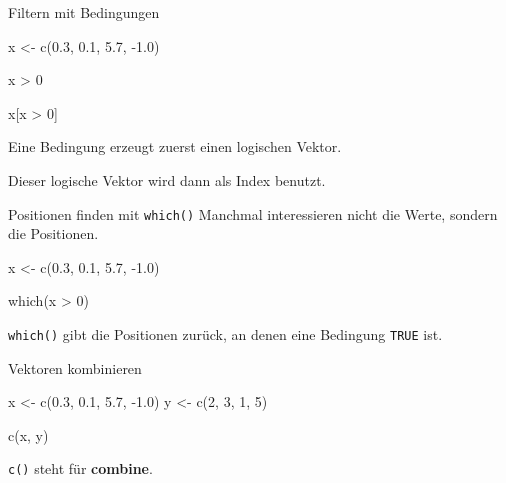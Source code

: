 \documentclass[
  10pt,
  ignorenonframetext,
  aspectratio=169,
]{beamer}
\newenvironment{Shaded}{}{}
\newcommand{\DecValTok}[1]{\textcolor[rgb]{0.25,0.63,0.44}{#1}}
\newcommand{\FloatTok}[1]{\textcolor[rgb]{0.25,0.63,0.44}{#1}}
\newcommand{\FunctionTok}[1]{\textcolor[rgb]{0.02,0.16,0.49}{#1}}
\newcommand{\NormalTok}[1]{#1}
\newcommand{\OtherTok}[1]{\textcolor[rgb]{0.00,0.44,0.13}{#1}}
\newcommand{\SpecialCharTok}[1]{\textcolor[rgb]{0.25,0.44,0.63}{#1}}
\begin{document}
\begin{frame}[fragile]{Filtern mit Bedingungen}
\label{filtern-mit-bedingungen}
\begin{Shaded}
\begin{Highlighting}[]
\NormalTok{x }\OtherTok{\textless{}{-}} \FunctionTok{c}\NormalTok{(}\FloatTok{0.3}\NormalTok{, }\FloatTok{0.1}\NormalTok{, }\FloatTok{5.7}\NormalTok{, }\SpecialCharTok{{-}}\FloatTok{1.0}\NormalTok{)}

\NormalTok{x }\SpecialCharTok{\textgreater{}} \DecValTok{0}

\NormalTok{x[x }\SpecialCharTok{\textgreater{}} \DecValTok{0}\NormalTok{]}
\end{Highlighting}
\end{Shaded}

Eine Bedingung erzeugt zuerst einen logischen Vektor.

Dieser logische Vektor wird dann als Index benutzt.
\end{frame}

\begin{frame}[fragile]{Positionen finden mit \texttt{which()}}
\label{positionen-finden-mit-which}
Manchmal interessieren nicht die Werte, sondern die Positionen.

\begin{Shaded}
\begin{Highlighting}[]
\NormalTok{x }\OtherTok{\textless{}{-}} \FunctionTok{c}\NormalTok{(}\FloatTok{0.3}\NormalTok{, }\FloatTok{0.1}\NormalTok{, }\FloatTok{5.7}\NormalTok{, }\SpecialCharTok{{-}}\FloatTok{1.0}\NormalTok{)}

\FunctionTok{which}\NormalTok{(x }\SpecialCharTok{\textgreater{}} \DecValTok{0}\NormalTok{)}
\end{Highlighting}
\end{Shaded}

\texttt{which()} gibt die Positionen zurück, an denen eine Bedingung
\texttt{TRUE} ist.
\end{frame}

\begin{frame}[fragile]{Vektoren kombinieren}
\label{vektoren-kombinieren}
\begin{Shaded}
\begin{Highlighting}[]
\NormalTok{x }\OtherTok{\textless{}{-}} \FunctionTok{c}\NormalTok{(}\FloatTok{0.3}\NormalTok{, }\FloatTok{0.1}\NormalTok{, }\FloatTok{5.7}\NormalTok{, }\SpecialCharTok{{-}}\FloatTok{1.0}\NormalTok{)}
\NormalTok{y }\OtherTok{\textless{}{-}} \FunctionTok{c}\NormalTok{(}\DecValTok{2}\NormalTok{, }\DecValTok{3}\NormalTok{, }\DecValTok{1}\NormalTok{, }\DecValTok{5}\NormalTok{)}

\FunctionTok{c}\NormalTok{(x, y)}
\end{Highlighting}
\end{Shaded}

\texttt{c()} steht für \textbf{combine}.
\end{frame}
\end{document}
